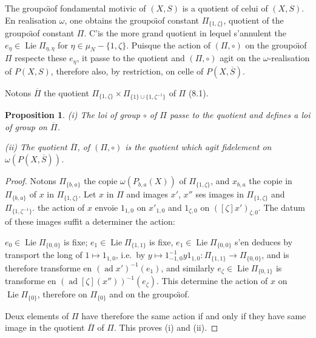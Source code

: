 \documentclass[11pt,a4paper]{article}
\theoremstyle{plain}
\newtheorem{proposition}[theorem]{Proposition}
\theoremstyle{definition}
\DeclareMathOperator{\Lie}{Lie}
\DeclareMathOperator{\ad}{ad}
\begin{document}
The groupo\"{\i}of fondamental motivic of $(X, S)$ is a quotient of celui of $(X, S)$. En realisation $\omega$, one obtains the groupo\"{\i}of constant $\Pi_{\{1,\zeta\}}$, quotient of the groupo\"{\i}of constant $\Pi$. C'is the more grand quotient in lequel s'annulent the $e_\eta \in \Lie \Pi_{\eta,\eta}$ for $\eta \in \mu_N - \{1, \zeta\}$. Puisque the action of $(\Pi, \circ)$ on the groupo\"{\i}of $\Pi$ respecte these $e_\eta$, it passe to the quotient and $(\Pi, \circ)$ agit on the $\omega$-realisation of $P(X, S)$, therefore also, by restriction, on celle of $P(X, \overline{S})$.

Notons $\overline{\Pi}$ the quotient $\Pi_{\{1,\zeta\}} \times \Pi_{\{1\} \cup \{1,\zeta^{-1}\}}$ of $\Pi$ (8.1).

\begin{proposition}\label{prop:8.4}
\emph{(i)} The loi of group $\circ$ of $\Pi$ passe to the quotient and defines a loi of group on $\overline{\Pi}$.

\emph{(ii)} The quotient $\overline{\Pi}$, of $(\Pi, \circ)$ is the quotient which agit fidelement on $\omega(P(X, \overline{S}))$.
\end{proposition}

\begin{proof}
Notons $\Pi_{\{b,a\}}$ the copie $\omega(P_{b,a}(X))$ of $\Pi_{\{1,\zeta\}}$, and $x_{b,a}$ the copie in $\Pi_{\{b,a\}}$ of $x$ in $\Pi_{\{1,\zeta\}}$. Let $x$ in $\Pi$ and images $x'$, $x''$ ses images in $\Pi_{\{1,\zeta\}}$ and $\Pi_{\{1,\zeta^{-1}\}}$. the action of $x$ envoie $1_{1,0}$ on $x'_{1,0}$ and $1_{\zeta,0}$ on $([\zeta]x')_{\zeta,0}$. The datum of these images suffit a determiner the action:

$e_0 \in \Lie \Pi_{\{0,0\}}$ is fixe; $e_1 \in \Lie \Pi_{\{1,1\}}$ is fixe, $e_1 \in \Lie \Pi_{\{0,0\}}$ s'en deduces by transport the long of $1 \mapsto 1_{1,0}$, i.e.~by $y \mapsto 1^{-1}_{-1,0} y 1_{1,0}: \Pi_{\{1,1\}} \to \Pi_{\{0,0\}}$, and is therefore transforme en $(\ad x')^{-1}(e_1)$, and similarly $e_\zeta \in \Lie \Pi_{\{0,1\}}$ is transforme en $(\ad [\zeta](x''))^{-1}(e_\zeta)$. This determine the action of $x$ on $\Lie \Pi_{\{0\}}$, therefore on $\Pi_{\{0\}}$ and on the groupo\"{\i}of.

Deux elements of $\Pi$ have therefore the same action if and only if they have same image in the quotient $\overline{\Pi}$ of $\Pi$. This proves (i) and (ii).
\end{proof}
\end{document}
